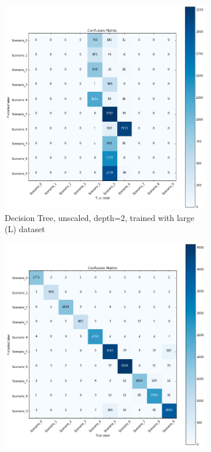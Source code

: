 \begin{figure}[!htb]
    \captionsetup[subfigure]{justification=centering}
    \centering
    \begin{subfigure}[htb]{0.49\textwidth}
        \centering
        \includegraphics[width=\linewidth]{figures/dtc_unscaled_L_2}
        \caption{Decision Tree, unscaled, depth=2, trained with large (L) dataset}
        \label{fig:knn_2}
    \end{subfigure}
    \begin{subfigure}[htb]{0.49\textwidth}
        \centering
        \includegraphics[width=\linewidth]{figures/dtc_unscaled_XL_50}

\end{subfigure}
\end{figure}
